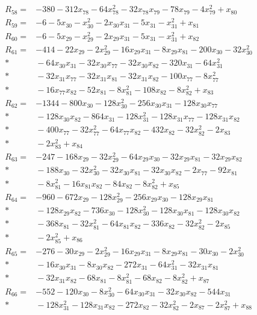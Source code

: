 \begin{align*}
R_{58}={}&-380-312x_{78}-64x_{78}^{2}-32x_{78}x_{79}-78x_{79}-4x_{79}^{2}+x_{80}\\[3pt]
R_{59}={}&-6-5x_{30}-x_{30}^{2}-2x_{30}x_{31}-5x_{31}-x_{31}^{2}+x_{81}\\[3pt]
R_{60}={}&-6-5x_{29}-x_{29}^{2}-2x_{29}x_{31}-5x_{31}-x_{31}^{2}+x_{82}\\[3pt]
R_{61}={}&-414-22x_{29}-2x_{29}^{2}-16x_{29}x_{31}-8x_{29}x_{81}-200x_{30}-32x_{30}^{2}\\*
&{}-64x_{30}x_{31}-32x_{30}x_{77}-32x_{30}x_{82}-320x_{31}-64x_{31}^{2}\\*
&{}-32x_{31}x_{77}-32x_{31}x_{81}-32x_{31}x_{82}-100x_{77}-8x_{77}^{2}\\*
&{}-16x_{77}x_{82}-52x_{81}-8x_{81}^{2}-108x_{82}-8x_{82}^{2}+x_{83}\\[3pt]
R_{62}={}&-1344-800x_{30}-128x_{30}^{2}-256x_{30}x_{31}-128x_{30}x_{77}\\*
&{}-128x_{30}x_{82}-864x_{31}-128x_{31}^{2}-128x_{31}x_{77}-128x_{31}x_{82}\\*
&{}-400x_{77}-32x_{77}^{2}-64x_{77}x_{82}-432x_{82}-32x_{82}^{2}-2x_{83}\\*
&{}-2x_{83}^{2}+x_{84}\\[3pt]
R_{63}={}&-247-168x_{29}-32x_{29}^{2}-64x_{29}x_{30}-32x_{29}x_{81}-32x_{29}x_{82}\\*
&{}-188x_{30}-32x_{30}^{2}-32x_{30}x_{81}-32x_{30}x_{82}-2x_{77}-92x_{81}\\*
&{}-8x_{81}^{2}-16x_{81}x_{82}-84x_{82}-8x_{82}^{2}+x_{85}\\[3pt]
R_{64}={}&-960-672x_{29}-128x_{29}^{2}-256x_{29}x_{30}-128x_{29}x_{81}\\*
&{}-128x_{29}x_{82}-736x_{30}-128x_{30}^{2}-128x_{30}x_{81}-128x_{30}x_{82}\\*
&{}-368x_{81}-32x_{81}^{2}-64x_{81}x_{82}-336x_{82}-32x_{82}^{2}-2x_{85}\\*
&{}-2x_{85}^{2}+x_{86}\\[3pt]
R_{65}={}&-276-30x_{29}-2x_{29}^{2}-16x_{29}x_{31}-8x_{29}x_{81}-30x_{30}-2x_{30}^{2}\\*
&{}-16x_{30}x_{31}-8x_{30}x_{82}-272x_{31}-64x_{31}^{2}-32x_{31}x_{81}\\*
&{}-32x_{31}x_{82}-68x_{81}-8x_{81}^{2}-68x_{82}-8x_{82}^{2}+x_{87}\\[3pt]
R_{66}={}&-552-120x_{30}-8x_{30}^{2}-64x_{30}x_{31}-32x_{30}x_{82}-544x_{31}\\*
&{}-128x_{31}^{2}-128x_{31}x_{82}-272x_{82}-32x_{82}^{2}-2x_{87}-2x_{87}^{2}+x_{88}\\[3pt]

\end{align*}
